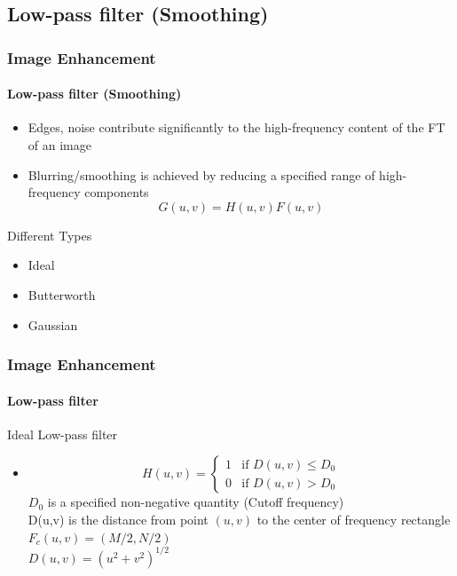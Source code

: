 \documentclass{beamer}
\begin{document}
\subsection{Low-pass filter (Smoothing)}
\begin{frame}
\frametitle{Image Enhancement}
\framesubtitle{Low-pass filter (Smoothing)}
\begin{itemize}
\item Edges, noise contribute significantly to the high-frequency content of the FT of an image
\item Blurring/smoothing is achieved by reducing a specified range of high-frequency components
$$ G(u,v) = H(u,v)F(u,v)$$
\end{itemize}
\begin{block}{Different Types}
\begin{itemize}
\item Ideal 
\item Butterworth
\item Gaussian
\end{itemize}
\end{block}
\end{frame}
\begin{frame}
\frametitle{Image Enhancement}
\framesubtitle{Low-pass filter}
\begin{block}{Ideal Low-pass filter}
\scriptsize{
\begin{itemize}
\item[] 	\[
 	H(u,v) = 
  	\begin{cases} 
   1 & \text{if } D(u,v) \leq D_{0} \\
   0 & \text{if } D(u,v) > D_{0}
  	\end{cases}
	\]
	\noindent $D_{0}$ is a specified non-negative quantity (Cutoff frequency) \\
	D(u,v) is the distance from point $(u,v)$ to the center of frequency rectangle\\
	$F_{c}(u,v) = (M/2, N/2)$\\
	$D(u,v) = (u^2+v^2)^{1/2}$\\
\end{itemize}
}
\end{block}
\end{frame}
\end{document}
